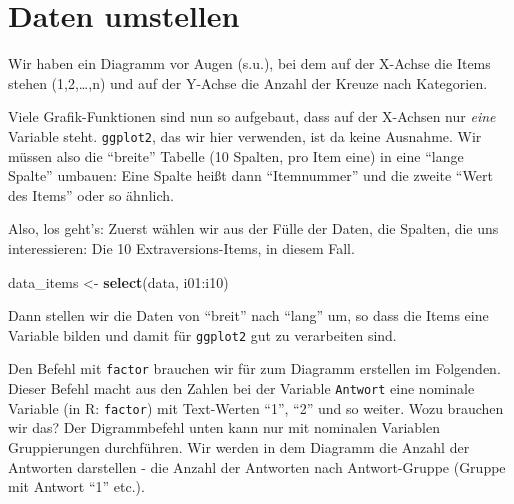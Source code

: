 \documentclass[12pt,ngerman,]{book}
\makeatletter
\newenvironment{Shaded}{\begin{snugshade}}{\end{snugshade}}
\newcommand{\KeywordTok}[1]{\textcolor[rgb]{0.13,0.29,0.53}{\textbf{{#1}}}}
\newcommand{\DataTypeTok}[1]{\textcolor[rgb]{0.13,0.29,0.53}{{#1}}}
\newcommand{\StringTok}[1]{\textcolor[rgb]{0.31,0.60,0.02}{{#1}}}
\newcommand{\NormalTok}[1]{{#1}}
\newenvironment{kframe}{%
\medskip{}
\setlength{\fboxsep}{.8em}
 \def\at@end@of@kframe{}%
 \ifinner\ifhmode%
  \def\at@end@of@kframe{\end{minipage}}%
  \begin{minipage}{\columnwidth}%
 \fi\fi%
 \def\FrameCommand##1{\hskip\@totalleftmargin \hskip-\fboxsep
 \colorbox{shadecolor}{##1}\hskip-\fboxsep
     \hskip-\linewidth \hskip-\@totalleftmargin \hskip\columnwidth}%
 \MakeFramed {\advance\hsize-\width
   \@totalleftmargin\z@ \linewidth\hsize
   \@setminipage}}%
 {\par\unskip\endMakeFramed%
 \at@end@of@kframe}
\renewenvironment{Shaded}{\begin{kframe}}{\end{kframe}}
\makeatother
\begin{document}
\section{Daten umstellen}\label{daten-umstellen}

Wir haben ein Diagramm vor Augen (s.u.), bei dem auf der X-Achse die
Items stehen (1,2,\ldots{},n) und auf der Y-Achse die Anzahl der Kreuze
nach Kategorien.

Viele Grafik-Funktionen sind nun so aufgebaut, dass auf der X-Achsen nur
\emph{eine} Variable steht. \texttt{ggplot2}, das wir hier verwenden,
ist da keine Ausnahme. Wir müssen also die ``breite'' Tabelle (10
Spalten, pro Item eine) in eine ``lange Spalte'' umbauen: Eine Spalte
heißt dann ``Itemnummer'' und die zweite ``Wert des Items'' oder so
ähnlich.

Also, los geht's: Zuerst wählen wir aus der Fülle der Daten, die
Spalten, die uns interessieren: Die 10 Extraversions-Items, in diesem
Fall.

\begin{Shaded}
\begin{Highlighting}[]
\NormalTok{data_items <-}\StringTok{ }\KeywordTok{select}\NormalTok{(data, i01:i10)}
\end{Highlighting}
\end{Shaded}

Dann stellen wir die Daten von ``breit'' nach ``lang'' um, so dass die
Items eine Variable bilden und damit für \texttt{ggplot2} gut zu
verarbeiten sind.

\begin{Shaded}
\end{Shaded}

Den Befehl mit \texttt{factor} brauchen wir für zum Diagramm erstellen
im Folgenden. Dieser Befehl macht aus den Zahlen bei der Variable
\texttt{Antwort} eine nominale Variable (in R: \texttt{factor}) mit
Text-Werten ``1'', ``2'' und so weiter. Wozu brauchen wir das? Der
Digrammbefehl unten kann nur mit nominalen Variablen Gruppierungen
durchführen. Wir werden in dem Diagramm die Anzahl der Antworten
darstellen - die Anzahl der Antworten nach Antwort-Gruppe (Gruppe mit
Antwort ``1'' etc.).
\end{document}
